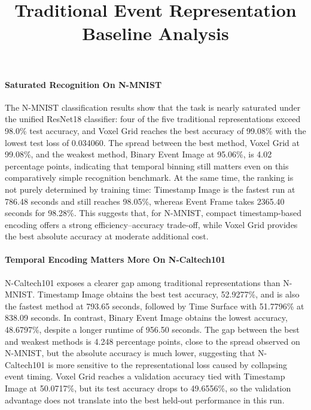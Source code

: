 \documentclass[11pt]{article}
\title{Traditional Event Representation Baseline Analysis}
\author{}
\date{}
\begin{document}
\sloppy
\maketitle

\paragraph{Saturated Recognition On N-MNIST} The N-MNIST classification results show that the task is nearly saturated under the unified ResNet18 classifier: four of the five traditional representations exceed 98.0\% test accuracy, and Voxel Grid reaches the best accuracy of 99.08\% with the lowest test loss of 0.034060. The spread between the best method, Voxel Grid at 99.08\%, and the weakest method, Binary Event Image at 95.06\%, is 4.02 percentage points, indicating that temporal binning still matters even on this comparatively simple recognition benchmark. At the same time, the ranking is not purely determined by training time: Timestamp Image is the fastest run at 786.48 seconds and still reaches 98.05\%, whereas Event Frame takes 2365.40 seconds for 98.28\%. This suggests that, for N-MNIST, compact timestamp-based encoding offers a strong efficiency--accuracy trade-off, while Voxel Grid provides the best absolute accuracy at moderate additional cost.

\paragraph{Temporal Encoding Matters More On N-Caltech101} N-Caltech101 exposes a clearer gap among traditional representations than N-MNIST. Timestamp Image obtains the best test accuracy, 52.9277\%, and is also the fastest method at 793.65 seconds, followed by Time Surface with 51.7796\% at 838.09 seconds. In contrast, Binary Event Image obtains the lowest accuracy, 48.6797\%, despite a longer runtime of 956.50 seconds. The gap between the best and weakest methods is 4.248 percentage points, close to the spread observed on N-MNIST, but the absolute accuracy is much lower, suggesting that N-Caltech101 is more sensitive to the representational loss caused by collapsing event timing. Voxel Grid reaches a validation accuracy tied with Timestamp Image at 50.0717\%, but its test accuracy drops to 49.6556\%, so the validation advantage does not translate into the best held-out performance in this run.
\end{document}
